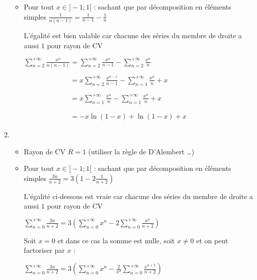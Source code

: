 \documentclass{book}
\begin{document}
\begin{Exercice}
\begin{Correction}
\begin{enumerate}
\begin{itemize}
    	\item Pour tout $x \in ]-1 ; 1[$ : sachant que par décomposition en éléments simples $\frac{1}{n(n-1)} = \frac{1}{n-1} - \frac{1}{n}$
    	
    	 L'égalité est bien valable car chacune des séries du membre de droite a aussi $1$ pour rayon de CV  
    	
\hspace{0.7cm} $\sum\limits_{n = 2}^{ + \infty } \frac{x^n }{n(n - 1)}  =  
\sum\limits_{n = 2}^{ + \infty } \frac{x^n }{n - 1} -  \sum\limits_{n = 2}^{ + \infty } \frac{ x^n }{ n }$
    	
\hspace{0.7cm} $\phantom{  \sum\limits_{n = 2}^{ + \infty } \frac{x^n }{n(n - 1)}  }=    
x \sum\limits_{n = 2}^{ + \infty } \frac{x^{n-1} }{n - 1} -  \sum\limits_{n = 1}^{ + \infty } \frac{ x^n }{ n } + x$

\hspace{0.7cm} $\phantom{  \sum\limits_{n = 2}^{ + \infty } \frac{x^n }{n(n - 1)}  }=    
x \sum\limits_{n = 1}^{ + \infty } \frac{x^{n}}{n} -  \sum\limits_{n = 1}^{ + \infty } \frac{ x^n }{ n } + x$

\hspace{0.7cm} $\phantom{  \sum\limits_{n = 2}^{ + \infty } \frac{x^n }{n(n - 1)}  }=  
- x \ln(1-x)   +  \ln(1-x) + x $
    \end{itemize}	

	\item %
    \begin{itemize}
    	\item Rayon de CV $R = 1$ (utiliser la règle de D'Alembert \dots)
    	
    	\item Pour tout $x \in ]-1 ; 1[$ : sachant que par décomposition en éléments simples $\frac{3n}{n+2} = 3\left( 1 - 2 \frac{1}{n+2} \right)$
   
  L'égalité ci-dessous est vraie car chacune des séries du membre de droite a aussi $1$ pour rayon de CV     
    	
\hspace{0.7cm} $\sum\limits_{n = 0}^{ + \infty } \frac{3n }{n+2}   =  
3 \left( \sum\limits_{n = 0}^{ + \infty } x^n  -  2 \sum\limits_{n = 0}^{ + \infty } \frac{ x^n }{ n+2 } \right)$

Soit $x=0$ et dans ce cas la somme est nulle, soit $x \neq 0$ et on peut factoriser par $x$ :

\hspace{0.7cm} $\sum\limits_{n = 0}^{ + \infty } \frac{3n }{n+2}   =  
3 \left( \sum\limits_{n = 0}^{ + \infty } x^n  -  \frac{2}{x^2} \sum\limits_{n = 0}^{ + \infty } \frac{ x^{n+2} }{ n+2 } \right)$
    	

\end{itemize}
\end{enumerate}
\end{Correction}
\end{Exercice}
\end{document}
